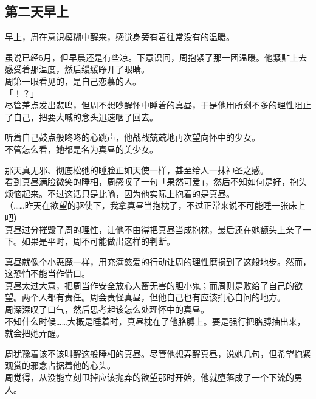 \subsection{第二天早上}

早上，周在意识模糊中醒来，感觉身旁有着往常没有的温暖。

虽说已经5月，但早晨还是有些凉。下意识间，周抱紧了那一团温暖。他紧贴上去感受着那温度，然后缓缓睁开了眼睛。\\

周第一眼看见的，是自己恋慕的人。\\

「！？」\\

尽管差点发出悲鸣，但周不想吵醒怀中睡着的真昼，于是他用所剩不多的理性阻止了自己，把要大喊的念头迅速咽了回去。

听着自己鼓点般咚咚的心跳声，他战战兢兢地再次望向怀中的少女。\\

不管怎么看，她都是名为真昼的美少女。

那天真无邪、彻底松弛的睡脸正如天使一样，甚至给人一抹神圣之感。\\

看到真昼满脸微笑的睡相，周感叹了一句「果然可爱」，然后不知如何是好，抱头烦恼起来。不过这话只是比喻，因为他实际上抱着的是真昼。\\

（……昨天在欲望的驱使下，我拿真昼当抱枕了，不过正常来说不可能睡一张床上吧）\\

真昼过分摧毁了周的理性，让他不由得把真昼当成抱枕，最后还在她额头上亲了一下。如果是平时，周不可能做出这样的判断。

真昼就像个小恶魔一样，用充满慈爱的行动让周的理性磨损到了这般地步。然而，这恐怕不能当作借口。\\

真昼太过大意，把周当作安全放心人畜无害的胆小鬼；而周则是败给了自己的欲望。两个人都有责任。周会责怪真昼，但他自己也有应该扪心自问的地方。\\

周深深叹了口气，然后思考起该怎么处理怀中的真昼。\\

不知什么时候……大概是睡着时，真昼枕在了他胳膊上。要是强行把胳膊抽出来，就会把她弄醒。

周犹豫着该不该叫醒这般睡相的真昼。尽管他想弄醒真昼，说她几句，但希望抱紧观赏的邪念占据着他的心头。\\

周觉得，从没能立刻甩掉应该抛弃的欲望那时开始，他就堕落成了一个下流的男人。\\

